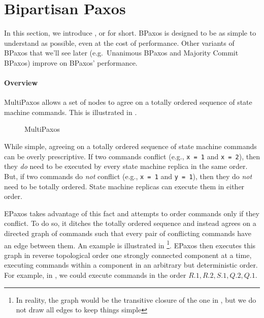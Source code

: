 \section{Bipartisan Paxos}
In this section, we introduce , or 
for short. BPaxos is designed to be as simple to understand as possible, even
at the cost of performance. Other variants of BPaxos that we'll see later
(e.g.\ Unanimous BPaxos and Majority Commit BPaxos) improve on BPaxos'
performance.

\paragraph{Overview}
MultiPaxos allows a set of nodes to agree on a totally ordered sequence of
state machine commands. This is illustrated in .

\begin{figure}[h]
  \centering
  \caption{MultiPaxos}
\end{figure}

While simple, agreeing on a totally ordered sequence of state machine commands
can be overly prescriptive. If two commands conflict (e.g., \texttt{x = 1} and
\texttt{x = 2}), then they \emph{do} need to be executed by every state machine
replica in the same order. But, if two commands do \emph{not} conflict (e.g.,
\texttt{x = 1} and \texttt{y = 1}), then they do \emph{not} need to be totally
ordered.  State machine replicas can execute them in either order.

EPaxos takes advantage of this fact and attempts to order commands only if they
conflict. To do so, it ditches the totally ordered sequence and instead agrees
on a directed graph of commands such that every pair of conflicting commands
have an edge between them. An example is illustrated in %
\footnote{%
  In reality, the graph would be the transitive closure of the one in
  , but we do not draw all edges to keep things simple
}.
EPaxos then executes this graph in reverse topological order one strongly
connected component at a time, executing commands within a component in an
arbitrary but deterministic order. For example, in , we
could execute commands in the order $R.1, R.2, S.1, Q.2, Q.1$.

